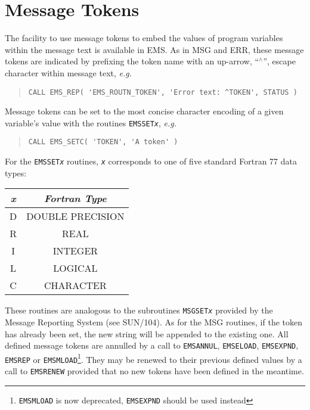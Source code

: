 \documentclass[twoside,11pt]{article}
\newcommand{\xref}[3]{#1}
\newcommand{\xlabel}[1]{}
\renewcommand{\_}{\texttt{\symbol{95}}}
\begin{document}
\section{\xlabel{message_tokens}Message Tokens}
The facility to use message tokens to embed the values of program variables
within the message text is available in EMS.
As in MSG and ERR, these message tokens are  indicated by prefixing the token
name with an up-arrow, ``$^\wedge$'', escape character within message text, 
\textit{e.g.}
\begin{quote}
\begin{verbatim}
CALL EMS_REP( 'EMS_ROUTN_TOKEN', 'Error text: ^TOKEN', STATUS )
\end{verbatim}
\end{quote}
Message tokens can be set to the most concise character encoding of a given
variable's value with the routines \texttt{EMS\_SET\textit{x}}, \textit{e.g.}
\begin{quote}
\begin{verbatim}
CALL EMS_SETC( 'TOKEN', 'A token' )
\end{verbatim}
\end{quote}
For the \texttt{EMS\_SET\textit{x}} routines, \texttt{\textit{x}} corresponds
to one of five standard Fortran 77 data types:
\begin {center}
\begin {tabular}{||c|c||}
\hline
\textit{\textit{x}} & \textit{Fortran Type}\\
\hline
D & DOUBLE PRECISION\\
R & REAL\\
I & INTEGER\\
L & LOGICAL\\
C & CHARACTER\\
\hline
\end {tabular}
\end {center}
These routines are analogous to the subroutines \texttt{MSG\_SET\textit{x}}
provided by the Message Reporting System (see 
\xref{SUN/104}{sun104}{message_tokens}). 
As for the MSG routines, if the token has already been set, the new string
will be appended to the existing one.
All defined message tokens are annulled by a call to \texttt{EMS\_ANNUL},
\texttt{EMS\_ELOAD},
\texttt{EMS\_EXPND}, \texttt{EMS\_REP} or
\texttt{EMS\_MLOAD}\footnote{\texttt{EMS\_MLOAD} is now deprecated,
\texttt{EMS\_EXPND} should be used instead}.
They may be renewed to their previous defined values by a call to
\texttt{EMS\_RENEW} provided that no new tokens have been defined in the
meantime.
\end{document}
